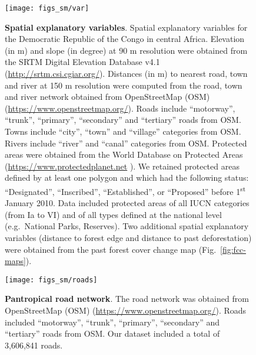 \documentclass[
  12pt,
]{article}
\begin{document}
\begin{figure}[H]

{\centering \texttt{[image: figs\_sm/var]} 

}

\caption{\textbf{Spatial explanatory variables}. Spatial explanatory variables for the Democratic Republic of the Congo in central Africa. Elevation (in m) and slope (in degree) at 90 m resolution were obtained from the SRTM Digital Elevation Database v4.1 (\url{http://srtm.csi.cgiar.org/}). Distances (in m) to nearest road, town and river at 150 m resolution were computed from the road, town and river network obtained from OpenStreetMap (OSM) (\url{https://www.openstreetmap.org/}). Roads include ``motorway'', ``trunk'', ``primary'', ``secondary'' and ``tertiary'' roads from OSM. Towns include ``city'', ``town'' and ``village'' categories from OSM. Rivers include ``river'' and ``canal'' categories from OSM. Protected areas were obtained from the World Database on Protected Areas (\url{https://www.protectedplanet.net} \citep{WDPA2020}). We retained protected areas defined by at least one polygon and which had the following status: ``Designated'', ``Inscribed'', ``Established'', or ``Proposed'' before 1\textsuperscript{st} January 2010. Data included protected areas of all IUCN categories (from Ia to VI) and of all types defined at the national level (e.g.~National Parks, Reserves). Two additional spatial explanatory variables (distance to forest edge and distance to past deforestation) were obtained from the past forest cover change map (Fig.~\ref{fig:fcc-maps}).}\label{fig:var}
\end{figure}



\begin{figure}[H]

{\centering \texttt{[image: figs\_sm/roads]} 

}

\caption{\textbf{Pantropical road network}. The road network was obtained from OpenStreetMap (OSM) (\url{https://www.openstreetmap.org/}). Roads included ``motorway'', ``trunk'', ``primary'', ``secondary'' and ``tertiary'' roads from OSM. Our dataset included a total of 3,606,841 roads.}\label{fig:data-roads}
\end{figure}
\end{document}
